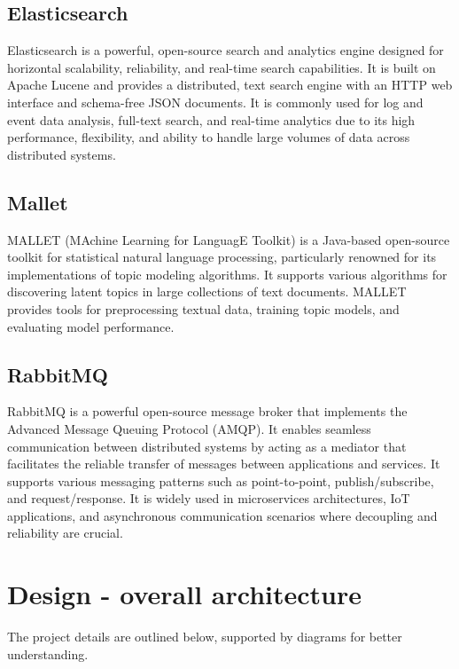 \subsection{Elasticsearch}
Elasticsearch is a powerful, open-source search and analytics engine designed for horizontal scalability,
reliability, and real-time search capabilities. It is built on Apache Lucene and provides a distributed, text
search engine with an HTTP web interface and schema-free JSON documents. It is commonly used for log and event
data analysis, full-text search, and real-time analytics due to its high performance, flexibility, and ability
to handle large volumes of data across distributed systems. \cite{elastic}

\subsection{Mallet}
MALLET (MAchine Learning for LanguagE Toolkit) is a Java-based open-source toolkit for statistical natural
language processing, particularly renowned for its implementations of topic modeling algorithms. It supports
various algorithms for discovering latent topics in large collections of text documents. MALLET provides tools
for preprocessing textual data, training topic models, and evaluating model performance. \cite{mallet}

\subsection{RabbitMQ}
RabbitMQ is a powerful open-source message broker that implements the Advanced Message Queuing Protocol (AMQP).
It enables seamless communication between distributed systems by acting as a mediator that facilitates the
reliable transfer of messages between applications and services. It supports various messaging patterns such
as point-to-point, publish/subscribe, and request/response. It is widely used in microservices architectures,
IoT applications, and asynchronous communication scenarios where decoupling and reliability are crucial.
\cite{rabbitmq}

\section{Design - overall architecture}
The project details are outlined below, supported by diagrams for better understanding.

